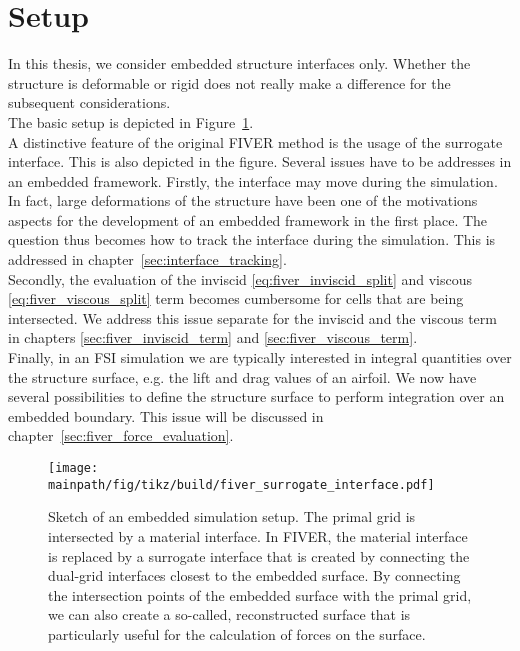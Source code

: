 \documentclass[../main.tex]{subfiles}
\begin{document}
\section{Setup}\label{sec:fiver_setup}
In this thesis, we consider embedded structure interfaces only. Whether the structure is deformable or rigid does not really make a difference for the subsequent considerations.\\
The basic setup is depicted in Figure~\ref{fig:FIVER_interchapter}.\\
A distinctive feature of the original \ac{FIVER} method is the usage of the surrogate interface. This is also depicted in the figure.
Several issues have to be addresses in an embedded framework. Firstly, the interface may move during the simulation. In fact, large deformations of the structure have been one of the motivations aspects for the development of an embedded framework in the first place. The question thus becomes how to track the interface during the simulation. This is addressed in chapter~\ref{sec:interface_tracking}.\\
Secondly, the evaluation of the inviscid \eqref{eq:fiver_inviscid_split} and viscous \eqref{eq:fiver_viscous_split} term becomes cumbersome for cells that are being intersected. We address this issue separate for the inviscid and the viscous term in chapters \ref{sec:fiver_inviscid_term} and \ref{sec:fiver_viscous_term}.\\
Finally, in an \ac{FSI} simulation we are typically interested in integral quantities over the structure surface, e.g. the lift and drag values of an airfoil. We now have several possibilities to define the structure surface to perform integration over an embedded boundary. This issue will be discussed in chapter~\ref{sec:fiver_force_evaluation}.

\begin{figure}[h!]
	\begin{center}
        \texttt{[image: \\mainpath/fig/tikz/build/fiver\_surrogate\_interface.pdf]}
        \caption[Immersed boundary method via \ac{FIVER}: setup]{Sketch of an embedded simulation setup. The primal grid is intersected by a material interface. In \ac{FIVER}, the material interface is replaced by a surrogate interface that is created by connecting the dual-grid interfaces closest to the embedded surface. By connecting the intersection points of the embedded surface with the primal grid, we can also create a so-called, reconstructed surface that is particularly useful for the calculation of forces on the surface.}
		\label{fig:FIVER_interchapter}
    \end{center}
\end{figure}
\end{document}
